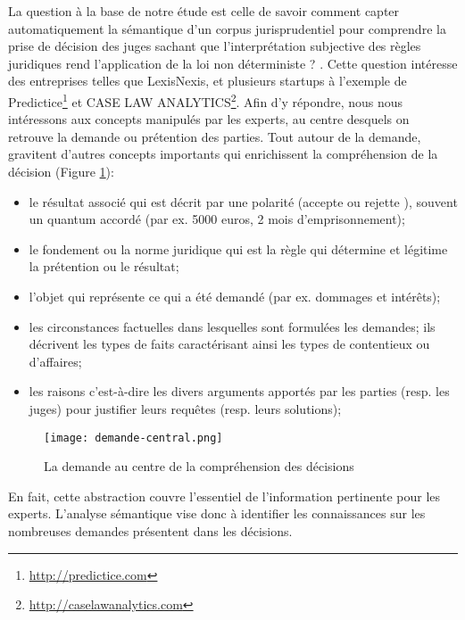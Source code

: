  La question à la base de notre étude est celle de savoir \og comment capter automatiquement la sémantique d'un corpus jurisprudentiel pour comprendre la prise de décision des juges sachant que l'interprétation subjective des règles juridiques rend l'application de la loi non déterministe ? \fg{}. Cette question intéresse des entreprises telles que LexisNexis, et plusieurs startups  à l'exemple de Predictice\footnote{\url{http://predictice.com}} et CASE LAW ANALYTICS\footnote{\url{http://caselawanalytics.com}}. Afin d'y répondre, nous nous intéressons  aux concepts manipulés par les experts, au centre desquels on retrouve la demande ou prétention des parties. Tout autour de la demande, gravitent d'autres concepts importants qui enrichissent la compréhension de la décision (Figure \ref{fig:intro:demande-central}): 
 \begin{itemize}
	\item le résultat associé qui est décrit par une polarité (\og accepte \fg{} ou \og rejette \fg{}), souvent un quantum accordé (par ex. 5000 euros, 2 mois d'emprisonnement);
	\item le fondement ou la norme juridique qui est la règle qui détermine et légitime la prétention ou le résultat;	
	\item l'objet qui représente ce qui a été demandé (par ex. dommages et intérêts);
	\item les circonstances factuelles 	dans lesquelles sont formulées les demandes; ils décrivent les types de faits caractérisant ainsi les types de contentieux ou d'affaires;
	\item les raisons c'est-à-dire les divers arguments apportés par les parties (resp. les juges) pour justifier leurs requêtes (resp. leurs solutions);
 \end{itemize}

\begin{figure}
    \centering
    \texttt{[image: demande-central.png]}
    \caption{La demande au centre de la compréhension des décisions}
    \label{fig:intro:demande-central}
\end{figure}

En fait, cette abstraction couvre l'essentiel de l'information pertinente pour les experts.  L'analyse sémantique vise donc à identifier les connaissances sur les nombreuses demandes présentent dans les décisions. 

